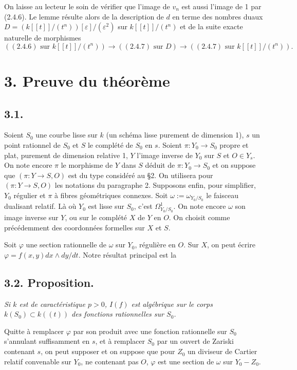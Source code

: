 \documentclass[11pt,leqno]{article}
\begin{document}
On laisse au lecteur le soin de vérifier que l'image de $v_n$ est aussi l'image de 1 par (2.4.6). Le lemme résulte alors de la description de $d$ en terme des nombres duaux $D=(k[[t]]/(t^n))[\varepsilon]/(\varepsilon^2)$ sur $k[[t]]/(t^n)$ et de la suite exacte naturelle de morphismes
\[
        ((2.4.6)\text{ sur }k[[t]]/(t^n))\longrightarrow((2.4.7)\text{ sur }D)
        \longrightarrow((2.4.7)\text{ sur }k[[t]]/(t^n)).
\]

\section*{3. Preuve du théorème}

\subsection*{3.1.}
Soient $S_0$ une courbe lisse sur $k$ (un schéma lisse purement de dimension 1), $s$ un point rationnel de $S_0$ et $S$ le complété de $S_0$ en $s$. Soient $\pi:Y_0\to S_0$ propre et plat, purement de dimension relative 1, $Y$ l'image inverse de $Y_0$ sur $S$ et $O\in Y_s$. On note encore $\pi$ le morphisme de $Y$ dans $S$ déduit de $\pi:Y_0\to S_0$ et on suppose que $(\pi:Y\to S,O)$ est du type considéré au §2. On utilisera pour $(\pi:Y\to S,O)$ les notations du paragraphe 2.
\clearpage
Supposons enfin, pour simplifier, $Y_0$ régulier et $\pi$ à fibres géométriques connexes. Soit $\omega:=\omega_{Y_0/S_0}$ le faisceau dualisant relatif. Là où $Y_0$ est lisse sur $S_0$, c'est $\Omega^1_{Y_0/S_0}$. On note encore $\omega$ son image inverse sur $Y$, ou sur le complété $X$ de $Y$ en $O$. On choisit comme précédemment des coordonnées formelles sur $X$ et $S$.

Soit $\varphi$ une section rationnelle de $\omega$ sur $Y_0$, régulière en $O$. Sur $X$, on peut écrire $\varphi=f(x,y)dx\wedge dy/dt$. Notre résultat principal est la

\subsection*{3.2. Proposition.}
\emph{Si $k$ est de caractéristique $p>0$, $I(f)$ est algébrique sur le corps $k(S_0)\subset k((t))$ des fonctions rationnelles sur $S_0$.}

Quitte à remplacer $\varphi$ par son produit avec une fonction rationnelle sur $S_0$ s'annulant suffisamment en $s$, et à remplacer $S_0$ par un ouvert de Zariski contenant $s$, on peut supposer et on suppose que pour $Z_0$ un diviseur de Cartier relatif convenable sur $Y_0$, ne contenant pas $O$, $\varphi$ est une section de $\omega$ sur $Y_0-Z_0$.
\end{document}
